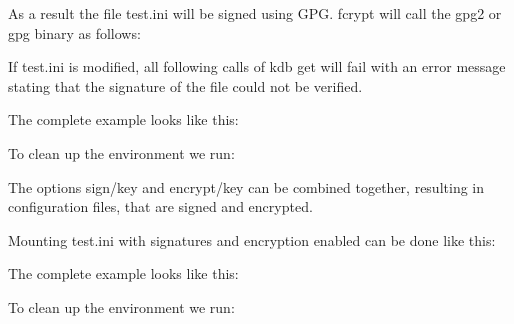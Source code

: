 As a result the file {\ttfamily test.\+ini} will be signed using G\+PG. {\ttfamily fcrypt} will call the {\ttfamily gpg2} or {\ttfamily gpg} binary as follows\+:


\begin{DoxyCode}{0}
\end{DoxyCode}


If {\ttfamily test.\+ini} is modified, all following calls of {\ttfamily kdb get} will fail with an error message stating that the signature of the file could not be verified.

The complete example looks like this\+:


\begin{DoxyCode}{0}
\end{DoxyCode}


To clean up the environment we run\+:


\begin{DoxyCode}{0}
\end{DoxyCode}


The options {\ttfamily sign/key} and {\ttfamily encrypt/key} can be combined together, resulting in configuration files, that are signed and encrypted.

Mounting {\ttfamily test.\+ini} with signatures and encryption enabled can be done like this\+:


\begin{DoxyCode}{0}
\end{DoxyCode}


The complete example looks like this\+:


\begin{DoxyCode}{0}
\end{DoxyCode}


To clean up the environment we run\+:


